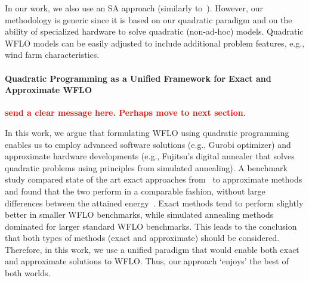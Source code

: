 \documentclass[preprint,12pt]{elsarticle}
\newcommand{\todo}[1]{{\textcolor{red}{\bf {#1}}}}
\begin{document}
In our work, we also use an SA approach (similarly to~\cite{rivas2009solving}). However,
our methodology is generic since it is based on our quadratic paradigm and
on the ability of specialized hardware to solve quadratic (non-ad-hoc) models.
Quadratic WFLO models can be easily adjusted to include additional problem features, e.g., wind farm characteristics. 

\paragraph{Quadratic Programming as a Unified Framework for Exact and Approximate WFLO}
\todo{send a clear message here. Perhaps move to next section}.

In this work, we argue that 
formulating WFLO using quadratic programming enables us to employ 
advanced software solutions (e.g., Gurobi optimizer) and approximate hardware developments 
(e.g., Fujitsu's digital annealer that solves quadratic problems using principles from simulated annealing). 
A benchmark study compared state of the art exact approaches from~\cite{Zhang2014} to 
approximate methods and found that the two perform in a comparable fashion, without large differences between
the attained energy~\cite{yang2019simulated}. Exact methods tend to perform slightly better
in smaller WFLO benchmarks, while simulated annealing methods dominated for larger standard WFLO benchmarks. 
This leads to the conclusion that both types of methods (exact and approximate) should be considered. 
Therefore, in this work, we use a unified paradigm that would enable both exact and approximate solutions to WFLO. Thus, 
our approach `enjoys' the best of both worlds. 

%
%
%
%
%
%
\end{document}
